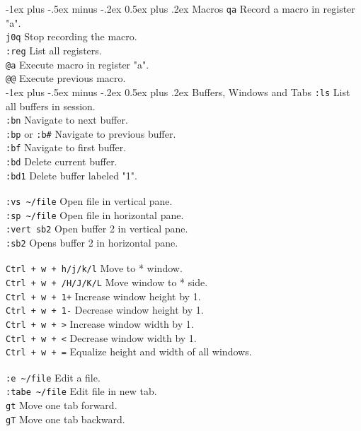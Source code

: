 \documentclass[10pt,landscape]{article}
\makeatletter
\renewcommand{\section}{\@startsection{section}{1}{0mm}%
                                {-1ex plus -.5ex minus -.2ex}%
                                {0.5ex plus .2ex}%
                                {\normalfont\large\bfseries}}
\makeatother
\begin{document}
\begin{multicols}{3}
\section{Macros}
\verb!qa! \hfill Record a macro in register "a".\\
\verb!j0q! \hfill Stop recording the macro.\\
\verb!:reg! \hfill List all registers.\\
\verb!@a! \hfill Execute macro in register "a".\\
\verb!@@! \hfill Execute previous macro.\\

\section{Buffers, Windows and Tabs}
\verb!:ls! \hfill List all buffers in session.\\
\verb!:bn! \hfill Navigate to next buffer.\\
\verb!:bp! or \verb!:b#! \hfill Navigate to previous buffer.\\
\verb!:bf! \hfill Navigate to first buffer.\\
\verb!:bd! \hfill Delete current buffer.\\
\verb!:bd1! \hfill Delete buffer labeled "1".\\ 
\verb! !\\
\verb!:vs ~/file! \hfill Open file in vertical pane.\\
\verb!:sp ~/file! \hfill Open file in horizontal pane.\\   
\verb!:vert sb2! \hfill Open buffer 2 in vertical pane.\\
\verb!:sb2! \hfill Opens buffer 2 in horizontal pane.\\
\verb! !\\
\verb!Ctrl + w + h/j/k/l! \hfill Move to * window.\\
\verb!Ctrl + w + /H/J/K/L! \hfill Move window to * side.\\                                   
\verb!Ctrl + w + 1+! \hfill Increase window height by 1.\\      
\verb!Ctrl + w + 1-! \hfill Decrease window height by 1.\\                                                                        
\verb!Ctrl + w + >!  \hfill Increase window width by 1.\\     
\verb!Ctrl + w + <!  \hfill Decrease window width by 1.\\           
\verb!Ctrl + w + =!  \hfill Equalize height and width of all windows.\\
\verb! !\\
\verb!:e ~/file! \hfill Edit a file.\\
\verb!:tabe ~/file! \hfill Edit file in new tab.\\
\verb!gt! \hfill Move one tab forward.\\
\verb!gT! \hfill Move one tab backward.\\


\end{multicols}
\end{document}

